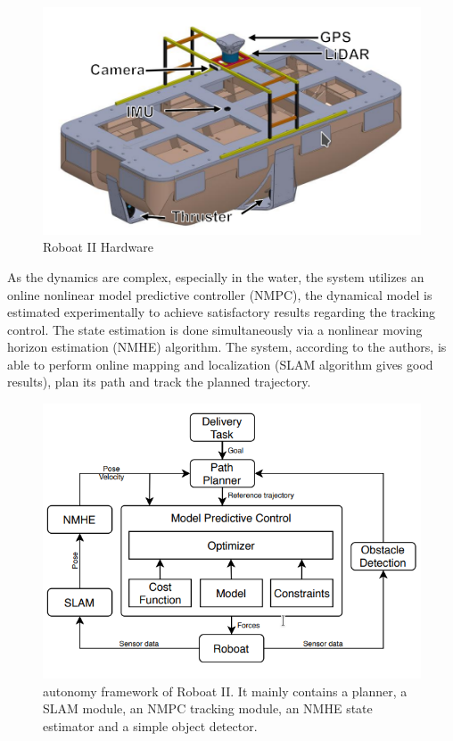 \documentclass{article}
\begin{document}
\begin{figure}[htbp]
	\centerline{\includegraphics[scale=.5]{roboatII-HW.png}}
	\caption{Roboat II Hardware}
	\label{fig}
\end{figure}

As the dynamics are complex, especially in the water, the system utilizes an online nonlinear model predictive controller (NMPC), the dynamical model is estimated experimentally to achieve satisfactory results regarding the tracking control. 
The state estimation is done simultaneously via a nonlinear moving horizon estimation (NMHE) algorithm. 
The system, according to the authors, is able to perform online mapping and localization (SLAM algorithm gives good results), plan its path and track the planned trajectory. 

\begin{figure}[htbp]
	\centerline{\includegraphics[scale=.5]{roboat-autonomy-framework.png}}
	\caption{autonomy framework of Roboat II. It mainly contains
		a planner, a SLAM module, an NMPC tracking module, an NMHE state
		estimator and a simple object detector.}
	\label{fig2}
\end{figure}
\end{document}
